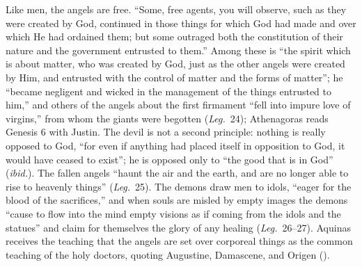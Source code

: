 \noindent Like men, the angels are free. ``Some, free agents, you will
observe, such as they were created by God, continued in those things for
which God had made and over which He had ordained them; but some outraged
both the constitution of their nature and the government entrusted to
them.'' Among these is ``the spirit which is about matter, who was created
by God, just as the other angels were created by Him, and entrusted with
the control of matter and the forms of matter''; he ``became negligent and
wicked in the management of the things entrusted to him,'' and others of
the angels about the first firmament ``fell into impure love of virgins,''
from whom the giants were begotten (\emph{Leg.}\ 24); Athenagoras reads
Genesis 6 with Justin. The devil is not a second
principle: nothing is really opposed to God, ``for even if anything had
placed itself in opposition to God, it would have ceased to exist''; he is
opposed only to ``the good that is in God'' (\emph{ibid.}). The fallen
angels ``haunt the air and the earth, and are no longer able to rise to
heavenly things'' (\emph{Leg.}\ 25). The demons draw men to idols, ``eager
for the blood of the sacrifices,'' and when souls are misled by empty
images the demons ``cause to flow into the mind empty visions as if coming
from the idols and the statues'' and claim for themselves the glory of any
healing (\emph{Leg.}\ 26--27). Aquinas receives the teaching that the
angels are set over corporeal things as the common teaching of the holy
doctors, quoting Augustine, Damascene, and Origen ().

